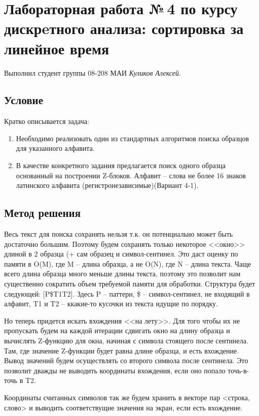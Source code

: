 \documentclass[12pt]{article}
\begin{document}
\section*{Лабораторная работа №\,4 по курсу дискрeтного анализа: сортировка за линейное время}

Выполнил студент группы 08-208 МАИ \textit{Куликов Алексей}.

\subsection*{Условие}

Кратко описывается задача: 
\begin{enumerate}
\item Необходимо реализовать один из стандартных алгоритмов поиска образцов для указанного
алфавита.
\item В качестве конкретного задания предлагается поиск одного образца основанный на построении Z-блоков. Алфавит --  слова не более 16 знаков латинского алфавита (регистронезависимые)(Вариант 4-1).
\end{enumerate}

\subsection*{Метод решения}
Весь текст для поиска сохранять нельзя т.к. он потенциально может быть достаточно большим. Поэтому будем сохранять только некоторое <<окно>> длиной в 2 образца (+ сам образец и символ-сентинел. Это даст оценку по памяти в O(M), где M -- длина образца, а не O(N), где N -- длина текста. Чаще всего длина образца много меньше длины текста, поэтому это позволит нам существенно сократить объем требуемой памяти для обработки. Структура будет следующей: [P\$T1T2]. Здесь P -- паттерн, \$ -- символ-сентинел, не входящий в алфавит, T1 и T2 -- ккакие-то кусочки из текста идущие по порядку.

Но теперь придется искать вхождения <<на лету>>. Для того чтобы их не пропускать будем на каждой итерации сдвигать окно на длину образца и вычислять Z-функцию для окна, начиная с символа стоящего после сентинела. Там, где значение Z-функции будет равна длине образца, и есть вхождение. Вывод значений будем осуществлять со второго символа после сентинела. Это позволит дважды не выводить координаты вхождения, если оно попало точь-в-точь в T2.

Координаты считанных символов так же будем хранить в векторе пар <строка, слово> и выводить соответствущие значения на экран, если есть вхождение.
\end{document}
